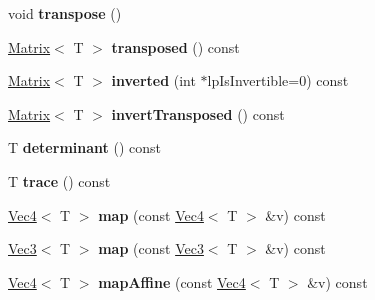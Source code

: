 \begin{DoxyCompactItemize}
\item 
\hypertarget{classps_1_1base_1_1Matrix_a38fdc380f58d10c0442de63605457fba}{}void {\bfseries transpose} ()\label{classps_1_1base_1_1Matrix_a38fdc380f58d10c0442de63605457fba}

\item 
\hypertarget{classps_1_1base_1_1Matrix_ac8dffdf717ef66b41e0b1d882683d95d}{}\hyperlink{classps_1_1base_1_1Matrix}{Matrix}$<$ T $>$ {\bfseries transposed} () const \label{classps_1_1base_1_1Matrix_ac8dffdf717ef66b41e0b1d882683d95d}

\item 
\hypertarget{classps_1_1base_1_1Matrix_a85c2c59e0f30d8076088ae3027e2228a}{}\hyperlink{classps_1_1base_1_1Matrix}{Matrix}$<$ T $>$ {\bfseries inverted} (int $\ast$lp\+Is\+Invertible=0) const \label{classps_1_1base_1_1Matrix_a85c2c59e0f30d8076088ae3027e2228a}

\item 
\hypertarget{classps_1_1base_1_1Matrix_ad9334190876e1f08048d4efba3d22fbb}{}\hyperlink{classps_1_1base_1_1Matrix}{Matrix}$<$ T $>$ {\bfseries invert\+Transposed} () const \label{classps_1_1base_1_1Matrix_ad9334190876e1f08048d4efba3d22fbb}

\item 
\hypertarget{classps_1_1base_1_1Matrix_a903418c8b703fde9d81be28fc565389a}{}T {\bfseries determinant} () const \label{classps_1_1base_1_1Matrix_a903418c8b703fde9d81be28fc565389a}

\item 
\hypertarget{classps_1_1base_1_1Matrix_aeb37f89f202e7d5bc307e9a41c460977}{}T {\bfseries trace} () const \label{classps_1_1base_1_1Matrix_aeb37f89f202e7d5bc307e9a41c460977}

\item 
\hypertarget{classps_1_1base_1_1Matrix_aa098aba0cf51377c321243f74af6d89f}{}\hyperlink{classps_1_1base_1_1Vec4}{Vec4}$<$ T $>$ {\bfseries map} (const \hyperlink{classps_1_1base_1_1Vec4}{Vec4}$<$ T $>$ \&v) const \label{classps_1_1base_1_1Matrix_aa098aba0cf51377c321243f74af6d89f}

\item 
\hypertarget{classps_1_1base_1_1Matrix_a87984472cc92f9fdc57a2df7deddabbe}{}\hyperlink{classps_1_1base_1_1Vec3}{Vec3}$<$ T $>$ {\bfseries map} (const \hyperlink{classps_1_1base_1_1Vec3}{Vec3}$<$ T $>$ \&v) const \label{classps_1_1base_1_1Matrix_a87984472cc92f9fdc57a2df7deddabbe}

\item 
\hypertarget{classps_1_1base_1_1Matrix_a17dc7f09c5c2c0bf86bf9ca861338918}{}\hyperlink{classps_1_1base_1_1Vec4}{Vec4}$<$ T $>$ {\bfseries map\+Affine} (const \hyperlink{classps_1_1base_1_1Vec4}{Vec4}$<$ T $>$ \&v) const \label{classps_1_1base_1_1Matrix_a17dc7f09c5c2c0bf86bf9ca861338918}


\end{DoxyCompactItemize}
